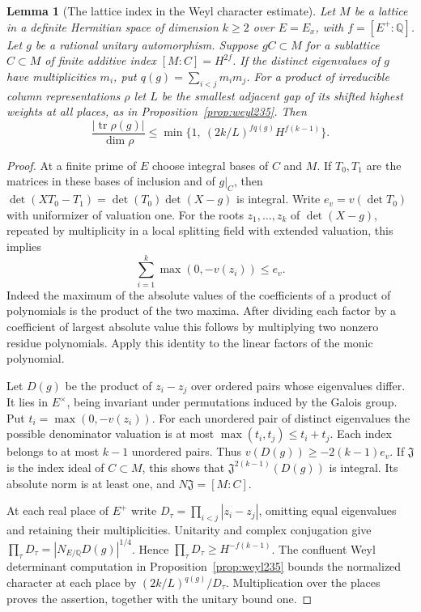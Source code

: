 \documentclass[a4paper,11pt]{article}
\newtheorem{lemma}[proposition]{Lemma}
\theoremstyle{definition}
\theoremstyle{remark}
\numberwithin{equation}{section}
\begin{document}
\begin{lemma}[The lattice index in the Weyl character estimate]
\leavevmode\label{lem:indexweyl635}
Let \(M\) be a lattice in a definite Hermitian space of dimension
\(k\ge2\) over \(E=E_x\), with \(f=[E^+:\mathbb Q]\).
Let \(g\) be a rational unitary automorphism. Suppose \(gC\subset M\)
for a sublattice \(C\subset M\) of finite additive index
\([M:C]=H^{2f}\). If the distinct eigenvalues of \(g\) have
multiplicities \(m_i\), put \(q(g)=\sum_{i<j}m_i m_j\).
For a product of irreducible column representations \(\rho\) let
\(L\) be the smallest adjacent gap of its shifted highest weights
at all places, as in Proposition~\ref{prop:weyl235}. Then
\[
 \frac{|\operatorname{tr}\rho(g)|}{\dim\rho}
     \le \min\{1,\ (2k/L)^{f q(g)}H^{f(k-1)}\}.
\]
\end{lemma}
\begin{proof}
At a finite prime of \(E\) choose integral bases of \(C\) and \(M\).
If \(T_0,T_1\) are the matrices in these bases of inclusion and of
\(g|_C\), then \(\det(XT_0-T_1)=\det(T_0)\det(X-g)\) is integral.
Write \(e_v=v(\det T_0)\) with uniformizer of valuation one.
For the roots \(z_1,\ldots,z_k\) of \(\det(X-g)\), repeated by
multiplicity in a local splitting field with extended valuation,
this implies
\[
              \sum_{i=1}^k \max(0,-v(z_i))\le e_v .
\]
Indeed the maximum of the absolute values of the coefficients of
a product of polynomials is the product of the two maxima. After
dividing each factor by a coefficient of largest absolute value
this follows by multiplying two nonzero residue polynomials.
Apply this identity to the linear factors of the monic polynomial.

Let \(D(g)\) be the product of \(z_i-z_j\) over ordered pairs
whose eigenvalues differ. It lies in \(E^\times\), being invariant
under permutations induced by the Galois group. Put
\(t_i=\max(0,-v(z_i))\). For each unordered pair of distinct
eigenvalues the possible denominator valuation is at most
\(\max(t_i,t_j)\le t_i+t_j\). Each index belongs to at most
\(k-1\) unordered pairs. Thus \(v(D(g))\ge-2(k-1)e_v\).
If \(\mathfrak J\) is the index ideal of \(C\subset M\), this
shows that \(\mathfrak J^{2(k-1)}(D(g))\) is integral. Its
absolute norm is at least one, and \(N\mathfrak J=[M:C]\).

At each real place of \(E^+\) write
\(D_\tau=\prod_{i<j}|z_i-z_j|\), omitting equal eigenvalues
and retaining their multiplicities. Unitarity and complex
conjugation give \(\prod_\tau D_\tau=|N_{E/\mathbb Q}D(g)|^{1/4}\).
Hence \(\prod_\tau D_\tau\ge H^{-f(k-1)}\).
The confluent Weyl determinant computation in
Proposition~\ref{prop:weyl235} bounds the normalized character at
each place by \((2k/L)^{q(g)}/D_\tau\). Multiplication over the
places proves the assertion, together with the unitary bound one.
\end{proof}
\end{document}
